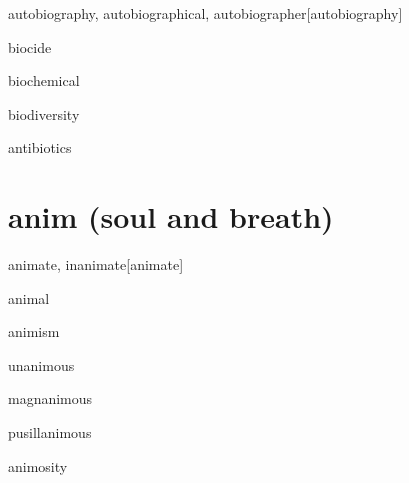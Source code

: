 \begin{RefWord}{autobiography, autobiographical, autobiographer}[autobiography]
\end{RefWord}

\begin{RefWord}{biocide}
\end{RefWord}

\begin{RefWord}{biochemical}
\end{RefWord}

\begin{RefWord}{biodiversity}
\end{RefWord}

\begin{RefWord}{antibiotics}
\end{RefWord}

\section{anim (soul and breath)}

\begin{RefWord}{animate, inanimate}[animate]
\end{RefWord}

\begin{RefWord}{animal}
\end{RefWord}

\begin{RefWord}{animism}
\end{RefWord}

\begin{RefWord}{unanimous}
\end{RefWord}

\begin{RefWord}{magnanimous}
\end{RefWord}

\begin{RefWord}{pusillanimous}
\end{RefWord}

\begin{RefWord}{animosity}
\end{RefWord}
